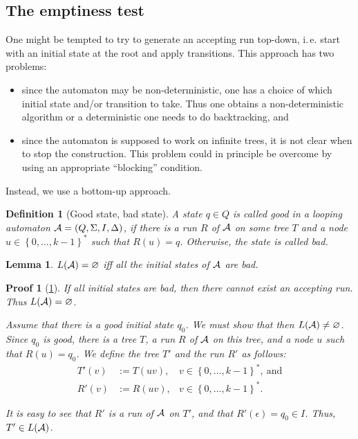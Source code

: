 \documentclass[openany]{scrbook}
\theoremstyle{break}
\newtheorem{Lemma}[Theorem]{Lemma}
\newtheorem{Definition}[Theorem]{Definition}
\theoremstyle{nonumberbreak}
\theoremstyle{nonumberplain}
\theoremstyle{nonumberbreak}
\newtheorem{Proof}{Proof}
\newcommand{\set}[1]{\left\{#1\right\}}
\newcommand{\ie}{i{.}\,e{.}\xspace}
\begin{document}
\subsection{The emptiness test}
One might be tempted to try to generate an accepting run top-down, \ie
start with an initial state at the root and apply transitions. This
approach has two problems:
\begin{itemize}
\item since the automaton may be non-deterministic, one has a choice
  of which initial state and/or transition to take. Thus one obtains a
  non-deterministic algorithm or a deterministic one needs to do
  backtracking, and
\item since the automaton is supposed to work on infinite trees, it is
  not clear when to stop the construction. This problem could in
  principle be overcome by using an appropriate ``blocking''
  condition.
\end{itemize}

Instead, we use a bottom-up approach.

\begin{Definition}[Good state, bad state]
  \label{5.4}
  A state $q \in Q$ is called good in a looping automaton ${\cal A} =
  (Q, \Sigma, I, \Delta)$, if there is a run $R$ of ${\cal A}$ on some
  tree $T$ and a node $u \in \set{0, \dotsc, k - 1}^*$ such that $R(u)
  = q$. Otherwise, the state is called bad.
\end{Definition}

\begin{Lemma}
  \label{5.5}
  $L({\cal A}) = \varnothing$ iff all the initial states of ${\cal A}$
  are bad.
\end{Lemma}

\begin{Proof}[\cref{5.5}]
  If all initial states are bad, then there cannot exist an accepting
  run. Thus $L({\cal A}) = \varnothing$.

  Assume that there is a good initial state $q_0$. We must show that
  then $L({\cal A}) \ne \varnothing$. Since $q_0$ is good, there is a
  tree $T$, a run $R$ of ${\cal A}$ on this tree, and a node $u$ such
  that $R(u) = q_0$. We define the tree $T'$ and the run $R'$ as
  follows:
  \begin{align*}
    T'(v) & := T(uv), & v \in \set{0, \dotsc, k -
      1}^*,\ \text{and} \\
    R'(v) & := R(uv), & v \in \set{0, \dotsc, k - 1}^*.
  \end{align*}

  It is easy to see that $R'$ is a run of ${\cal A}$ on $T'$, and that
  $R'(\epsilon) = q_0 \in I$. Thus, $T' \in L({\cal A})$.
\end{Proof}
\end{document}
